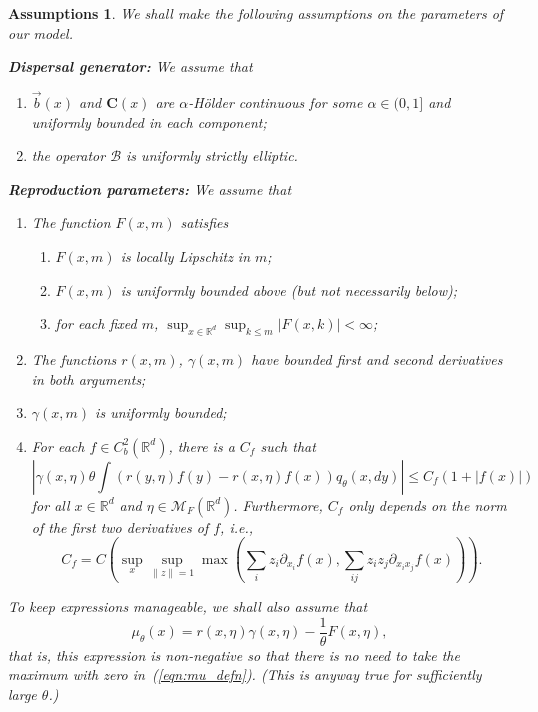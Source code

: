 \documentclass[12pt]{article}
\newtheorem{assumptions}[theorem]{Assumptions}
\newcommand{\IR}{\mathbb R}
\newcommand{\DG}{\mathcal{B}}  %
\newcommand{\meanq}{\vec b}    %
\newcommand{\covq}{\mathbf{C}}     %
\newcommand{\measures}{\mathcal{M}_F(\IR^d)} %
\numberwithin{equation}{section}
\begin{document}
\begin{assumptions}%
\label{def:model_setup}
We shall make the following assumptions on the parameters of our model.

{\bf Dispersal generator:}
We assume that
\begin{enumerate}
    \item $\meanq(x)$ and $\covq(x)$ are
        $\alpha$-H\"older continuous for some $\alpha \in (0, 1]$
        and uniformly bounded
        in each component;
    \item the operator $\DG$ is uniformly strictly elliptic.
\end{enumerate}

{\bf Reproduction parameters:}
We assume that 
\begin{enumerate}
            \addtocounter{enumi}{2}
\item The function $F(x,m)$ satisfies 
    \begin{enumerate}
    \item $F(x,m)$ is locally Lipschitz in $m$;
    \item $F(x,m)$ is uniformly bounded above (but not necessarily below);
    \item for each fixed $m$, $\sup_{x\in\IR^d}\sup_{k\leq m}|F(x,k)|<\infty$;
    \end{enumerate}
\item The functions $r(x,m)$, $\gamma(x,m)$ have bounded first and second 
    derivatives in both arguments;
    \label{r_gamma_derivs_condition}
\item $\gamma(x,m)$ is uniformly bounded;
    \label{gamma_bounded_condition}
\item For each $f \in C_b^2(\IR^d)$,
    there is a $C_f$ such that
    $$
        |\gamma(x, \eta) \theta \int 
        (r(y,\eta) f(y) - r(x, \eta) f(x))
        q_\theta(x, dy)| \le C_f (1 + |f(x)|)
    $$
    for all $x \in \IR^d$ and $\eta \in \measures$.
    Furthermore, $C_f$ only depends on the norm of the first two derivatives of $f$,
    i.e., 
    \[
        C_f = C(\sup_x \sup_{\|z\|=1} \max( \sum_i z_i \partial_{x_i} f(x), \sum_{ij} z_i z_j \partial_{x_i x_j} f(x))) .
    \] \label{gamma_B_condition}
\end{enumerate}
To keep expressions manageable, we shall also assume that 
\[
\mu_\theta(x) = r(x,\eta) \gamma(x,\eta) - \frac{1}{\theta} F(x,\eta),
\]
that is, this expression is non-negative so that there is no need to take the maximum
	with zero in~(\ref{eqn:mu_defn}). (This is anyway true for 
	sufficiently large $\theta$.)
\end{assumptions}
\end{document}

